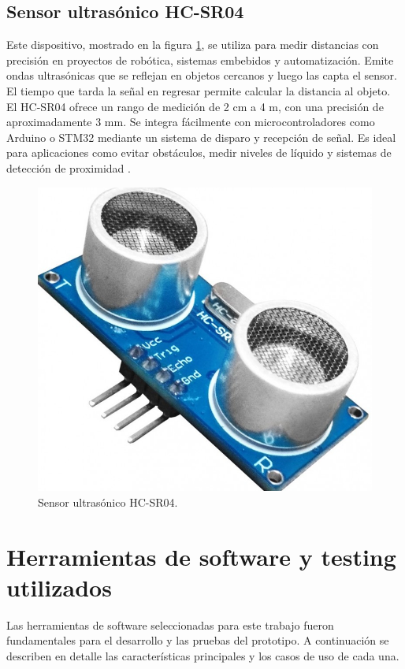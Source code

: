 
\subsection{Sensor ultrasónico HC-SR04}
\label{subsec:hcsr04}

Este dispositivo, mostrado en la figura \ref{fig:hcsr2024}, se utiliza para medir distancias con precisión en proyectos de robótica, sistemas embebidos y automatización. Emite ondas ultrasónicas que se reflejan en objetos cercanos y luego las capta el sensor. El tiempo que tarda la señal en regresar permite calcular la distancia al objeto. El HC-SR04 ofrece un rango de medición de 2 cm a 4 m, con una precisión de aproximadamente 3 mm. Se integra fácilmente con microcontroladores como Arduino o STM32 mediante un sistema de disparo y recepción de señal. Es ideal para aplicaciones como evitar obstáculos, medir niveles de líquido y sistemas de detección de proximidad \citep{WEBSITE:hcsr2024}.

\begin{figure}[htbp]
	\centering
	\includegraphics[width=.5\textwidth]{./Figures/hcsr04.png}
	\caption{Sensor ultrasónico HC-SR04\protect\footnotemark.}
	\label{fig:hcsr2024}
\end{figure}


\section{Herramientas de software y testing utilizados}

Las herramientas de software seleccionadas para este trabajo fueron fundamentales para el desarrollo y las pruebas del prototipo. A continuación se describen en detalle las características principales y los casos de uso de cada una.

